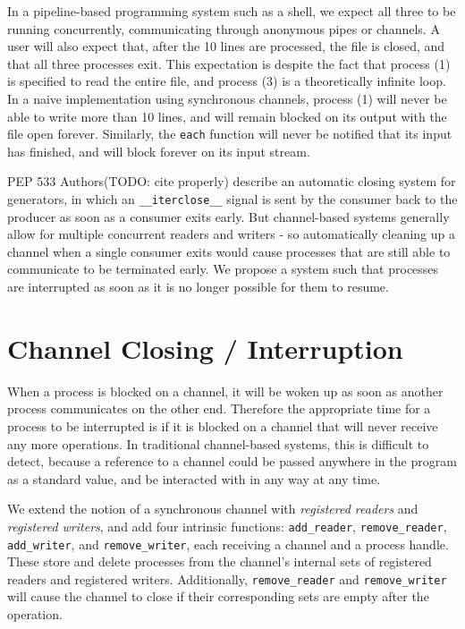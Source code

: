 \documentclass[format=sigconf, review=true, screen=true]{acmart}
\begin{document}
In a pipeline-based programming system such as a shell, we expect all three to be running concurrently, communicating through anonymous pipes or channels. A user will also expect that, after the 10 lines are processed, the file is closed, and that all three processes exit. This expectation is despite the fact that process (1) is specified to read the entire file, and process (3) is a theoretically infinite loop. In a naive implementation using synchronous channels, process (1) will never be able to write more than 10 lines, and will remain blocked on its output with the file open forever. Similarly, the \verb/each/ function will never be notified that its input has finished, and will block forever on its input stream.

PEP 533 Authors(TODO: cite properly) describe an automatic closing system for generators, in which an \verb/__iterclose__/ signal is sent by the consumer back to the producer as soon as a consumer exits early. But channel-based systems generally allow for multiple concurrent readers and writers - so automatically cleaning up a channel when a single consumer exits would cause processes that are still able to communicate to be terminated early. We propose a system such that processes are interrupted as soon as it is no longer possible for them to resume.

\section{Channel Closing / Interruption}

When a process is blocked on a channel, it will be woken up as soon as another process communicates on the other end. Therefore the appropriate time for a process to be interrupted is if it is blocked on a channel that will never receive any more operations. In traditional channel-based systems, this is difficult to detect, because a reference to a channel could be passed anywhere in the program as a standard value, and be interacted with in any way at any time.

We extend the notion of a synchronous channel with \emph{registered readers} and \emph{registered writers}, and add four intrinsic functions: \verb/add_reader/, \verb/remove_reader/, \verb/add_writer/, and \verb/remove_writer/, each receiving a channel and a process handle. These store and delete processes from the channel's internal sets of registered readers and registered writers. Additionally, \verb/remove_reader/ and \verb/remove_writer/ will cause the channel to close if their corresponding sets are empty after the operation.
\end{document}
